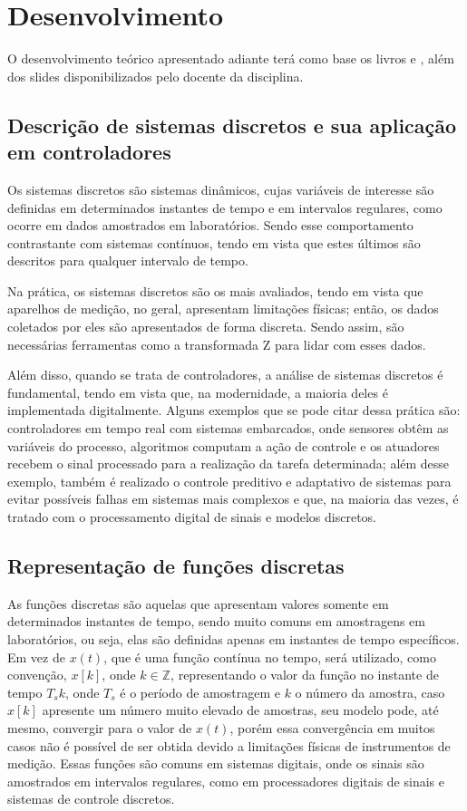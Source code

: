 \section{Desenvolvimento}
\label{Desenvolvimento}
O desenvolvimento teórico apresentado adiante terá como base os livros \cite{nise2015} e \cite{Vilma}, além dos slides disponibilizados pelo docente da disciplina.

\subsection{Descrição de sistemas discretos e sua aplicação em controladores}

Os sistemas discretos são sistemas dinâmicos, cujas variáveis de interesse são definidas em determinados instantes de tempo e em intervalos regulares, como ocorre em dados amostrados em laboratórios. Sendo esse comportamento contrastante com sistemas contínuos, tendo em vista que estes últimos são descritos para qualquer intervalo de tempo.

Na prática, os sistemas discretos são os mais avaliados, tendo em vista que aparelhos de medição, no geral, apresentam limitações físicas; então, os dados coletados por eles são apresentados de forma discreta. Sendo assim, são necessárias ferramentas como a transformada Z para lidar com esses dados.

Além disso, quando se trata de controladores, a análise de sistemas discretos é fundamental, tendo em vista que, na modernidade, a maioria deles é implementada digitalmente. Alguns exemplos que se pode citar dessa prática são: controladores em tempo real com sistemas embarcados, onde sensores obtêm as variáveis do processo, algoritmos computam a ação de controle e os atuadores recebem o sinal processado para a realização da tarefa determinada; além desse exemplo, também é realizado o controle preditivo e adaptativo de sistemas para evitar possíveis falhas em sistemas mais complexos e que, na maioria das vezes, é tratado com o processamento digital de sinais e modelos discretos.

\subsection{Representação de funções discretas}
\label{representacao_frac_parcial}
As funções discretas são aquelas que apresentam valores somente em determinados instantes de tempo, sendo muito comuns em amostragens em laboratórios, ou seja, elas são definidas apenas em instantes de tempo específicos. Em vez de \( x(t) \), que é uma função contínua no tempo, será utilizado, como convenção, \( x[k] \), onde \( k \in \mathbb{Z} \), representando o valor da função no instante de tempo $T_s$\( k \), onde $T_s$ é o período de amostragem e \( k \) o número da amostra, caso \( x[k] \) apresente um número muito elevado de amostras, seu modelo pode, até mesmo, convergir para o valor de \( x(t) \), porém essa convergência em muitos casos não é possível de ser obtida devido a limitações físicas de instrumentos de medição. Essas funções são comuns em sistemas digitais, onde os sinais são amostrados em intervalos regulares, como em processadores digitais de sinais e sistemas de controle discretos.

